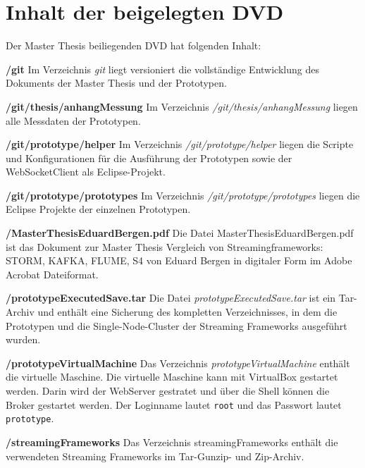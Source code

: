 






\section{Inhalt der beigelegten DVD}
\label{section:inhaltDvd}

Der Master Thesis beiliegenden DVD hat folgenden Inhalt:

\textbf{/git}
Im Verzeichnis \textit{git} liegt versioniert die vollständige Entwicklung des Dokuments der Master Thesis und der Prototypen.

\textbf{/git/thesis/anhangMessung}
Im Verzeichnis \textit{/git/thesis/anhangMessung} liegen alle Messdaten der Prototypen.

\textbf{/git/prototype/helper}
Im Verzeichnis \textit{/git/prototype/helper} liegen die Scripte und Konfigurationen für die Ausführung der Prototypen sowie der WebSocketClient als Eclipse-Projekt.

\textbf{/git/prototype/prototypes}
Im Verzeichnis \textit{/git/prototype/prototypes} liegen die Eclipse Projekte der einzelnen Prototypen.

\textbf{/MasterThesisEduardBergen.pdf} 
Die Datei MasterThesisEduardBergen.pdf ist das Dokument zur Master Thesis Vergleich von Streamingframeworks: STORM, KAFKA, FLUME, S4 von Eduard Bergen in digitaler Form im Adobe Acrobat Dateiformat.

\textbf{/prototypeExecutedSave.tar} 
Die Datei \textit{prototypeExecutedSave.tar} ist ein Tar-Archiv und enthält eine Sicherung des kompletten Verzeichnisses, in dem die Prototypen und die Single-Node-Cluster der Streaming Frameworks ausgeführt wurden.

\textbf{/prototypeVirtualMachine}
Das Verzeichnis \textit{prototypeVirtualMachine} enthält die virtuelle Maschine. Die virtuelle Maschine kann mit VirtualBox gestartet werden. Darin wird der WebServer gestratet und über die Shell können die Broker gestartet werden. Der Loginname lautet \texttt{root} und das Passwort lautet \texttt{prototype}.

\textbf{/streamingFrameworks}
Das Verzeichnis streamingFrameworks enthält die verwendeten Streaming Frameworks im Tar-Gunzip- und Zip-Archiv.